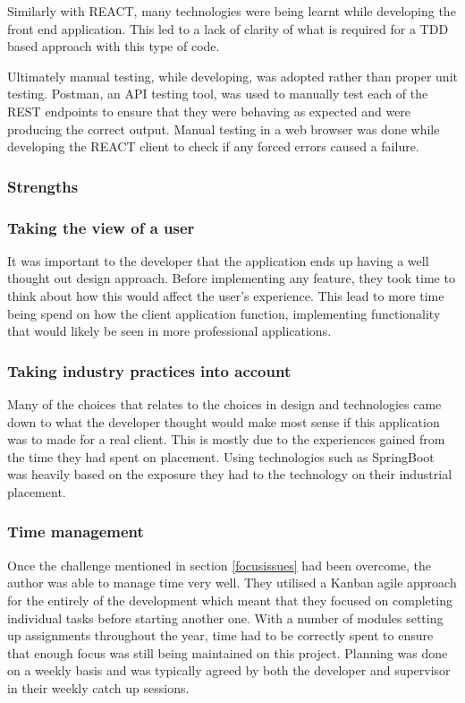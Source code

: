 Similarly with REACT, many technologies were being learnt while developing the front end application.
This led to a lack of clarity of what is required for a TDD based approach with this type of code.

Ultimately manual testing, while developing, was adopted rather than proper unit testing.
Postman, an API testing tool, was used to manually test each of the REST endpoints to ensure that they were behaving as expected and were producing
the correct output.
Manual testing in a web browser was done while developing the REACT client to check if any forced errors caused a failure.


\subsubsection{Strengths}

\subsubsection*{Taking the view of a user}
It was important to the developer that the application ends up having a well thought out design approach.
Before implementing any feature, they took time to think about how this would affect the user's experience. 
This lead to more time being spend on how the client application function, implementing functionality that would likely be seen in more professional
applications.

\subsubsection*{Taking industry practices into account}
Many of the choices that relates to the choices in design and technologies came down to what the developer thought would make most sense if this application
was to made for a real client.
This is mostly due to the experiences gained from the time they had spent on placement.
Using technologies such as SpringBoot was heavily based on the exposure they had to the technology on their industrial placement.

\subsubsection*{Time management}
Once the challenge mentioned in section \ref{focusissues} had been overcome, the author was able to manage time very well.
They utilised a Kanban agile approach for the entirely of the development which meant that they focused on completing individual tasks before starting
another one. 
With a number of modules setting up assignments throughout the year, time had to be correctly spent to ensure that enough focus was still being maintained 
on this project.
Planning was done on a weekly basis and was typically agreed by both the developer and supervisor in their weekly catch up sessions. 

